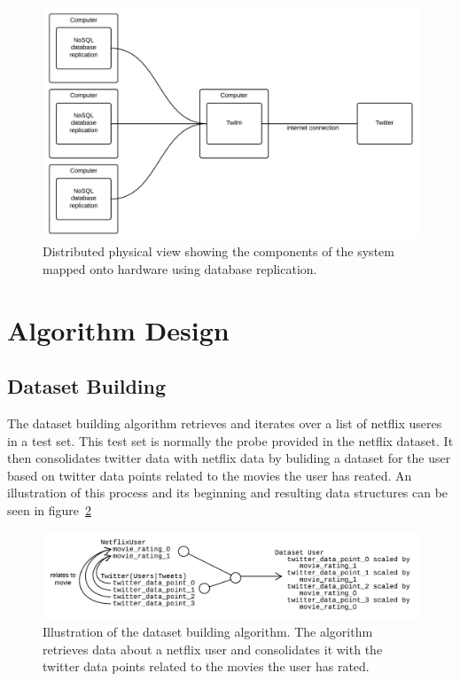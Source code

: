\begin{figure}[H]
\centerline{\includegraphics[width=4.5in]{image/architecture-physical-view-distributed.png}}
\caption{Distributed physical view showing the components of the system mapped onto hardware using database replication.}
\label{figure:development-view}
\end{figure}

\section{Algorithm Design}
\subsection{Dataset Building}\label{algorithm-design:dataset-building}
The dataset building algorithm retrieves and iterates over a list of netflix useres in a test set. This test set is normally the probe provided in the netflix dataset. It then consolidates twitter data with netflix data by buliding a dataset for the user based on twitter data points related to the movies the user has reated. An illustration of this process and its beginning and resulting data structures can be seen in figure~\ref{figure:dataset-building-algorithm}

\begin{figure}[H]
\centerline{\includegraphics[width=6in]{image/design-algorithm-dataset-building.png}}
\caption{Illustration of the dataset building algorithm. The algorithm retrieves data about a netflix user and consolidates it with the twitter data points related to the movies the user has rated.}
\label{figure:dataset-building-algorithm}
\end{figure}

